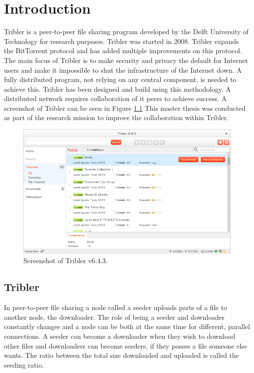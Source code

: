 \chapter{Introduction}
\label{chp:introduction}
Tribler is a peer-to-peer file sharing program developed by the Delft University of Technology for research purposes.
Tribler was started in 2008.
Tribler expands the BitTorrent protocol and has added multiple improvements on this protocol.
The main focus of Tribler is to make security and privacy the default for Internet users
and make it impossible to shut the infrastructure of the Internet down.
A fully distributed program, not relying on any central component, is needed to achieve this.
Tribler has been designed and build using this methodology\cite{Pouwelse-tribler}\cite{Bakker-tribler}.
A distributed network requires collaboration of it peers to achieve success.
A screenshot of Tribler can be seen in Figure \ref{fig:tribler-screenshot}
This master thesis was conducted as part of the research mission to improve the collaboration within Tribler.

\begin{figure}
	\centerline{\includegraphics[scale=0.3]{introduction/figs/tribler-screenshot.png}}
	\caption{Screenshot of Tribler v6.4.3.}
	\label{fig:tribler-screenshot}
\end{figure}

\section{Tribler}
In peer-to-peer file sharing a node called a seeder uploads parts
of a file to another node, the downloader.
The role of being a seeder and downloader constantly changes
and a node can be both at the same time for different, parallel connections.
A seeder can become a downloader when they wish to download other files
and downloaders can become seeders,
if they posses a file someone else wants.
The ratio between the total size downloaded and uploaded is called the seeding ratio\cite{Cohen-bittorrent}.

